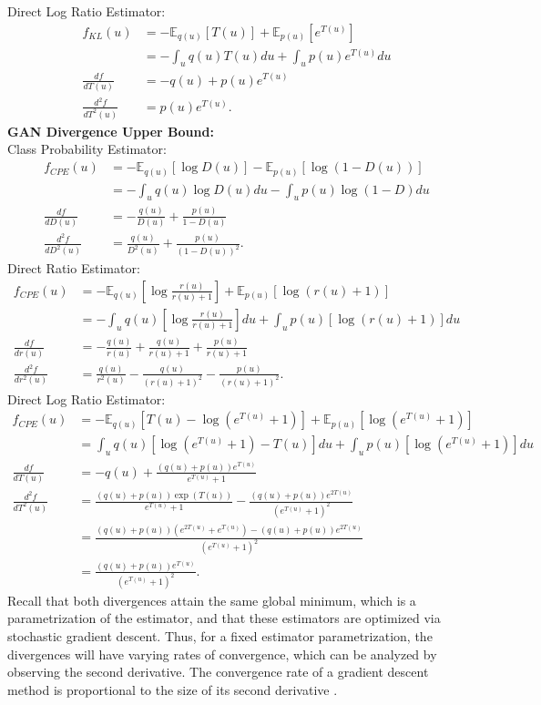 \documentclass[honours,12pt]{unswthesis}
\newcommand{\E}{\mathbb{E}}
\numberwithin{equation}{section}
\theoremstyle{definition}
\begin{document}
Direct Log Ratio Estimator:
\begin{align*}
f_{KL}(u)&=-\E_{q(u)}[T(u)]+\E_{p(u)}[e^{T(u)}]\\
&=-\int_u q(u)T(u)du+\int_u p(u)e^{T(u)}du\\
\frac{df}{dT(u)}&=-q(u)+p(u)e^{T(u)}\\
\frac{d^2f}{dT^2(u)}&=p(u)e^{T(u)}.
\end{align*}
\textbf{GAN Divergence Upper Bound:}\\
Class Probability Estimator:
\begin{align*}
f_{CPE}(u)&=-\E_{q(u)}[\log D(u)]-\E_{p(u)}[\log (1-D(u))]\\
&=-\int_u q(u)\log D(u) du -\int_u p(u)\log(1-D)du\\
\frac{df}{dD(u)}&=-\frac{q(u)}{D(u)}+\frac{p(u)}{1-D(u)}\\
\frac{d^2f}{dD^2(u)}&=\frac{q(u)}{D^2(u)}+\frac{p(u)}{(1-D(u))^2}.
\end{align*}
Direct Ratio Estimator:
\begin{align*}
f_{CPE}(u)&=-\E_{q(u)}\left[\log \frac{r(u)}{r(u)+1}\right]+\E_{p(u)}\left[\log(r(u)+1)\right]\\
&=-\int_u q(u)\left[\log \frac{r(u)}{r(u)+1}\right]du+\int_u p(u)\left[\log(r(u)+1)\right]du\\
\frac{df}{dr(u)}&=-\frac{q(u)}{r(u)}+\frac{q(u)}{r(u)+1}+\frac{p(u)}{r(u)+1}\\
\frac{d^2f}{dr^2(u)}&=\frac{q(u)}{r^2(u)}-\frac{q(u)}{(r(u)+1)^2}-\frac{p(u)}{(r(u)+1)^2}.
\end{align*}
Direct Log Ratio Estimator:
\begin{align*}
f_{CPE}(u)&=-\E_{q(u)}[T(u)-\log(e^{T(u)}+1)]+\E_{p(u)}[\log(e^{T(u)}+1)]\\
&=\int_u q(u)[\log(e^{T(u)}+1)-T(u)] du+\int_u p(u)[\log(e^{T(u)}+1)]du\\
\frac{df}{dT(u)}&=-q(u)+\frac{(q(u)+p(u))e^{T(u)}}{e^{T(u)}+1}\\
\frac{d^2f}{dT^2(u)}&=\frac{(q(u)+p(u))\exp(T(u))}{e^{T(u)}+1}-\frac{(q(u)+p(u))e^{2T(u)}}{(e^{T(u)}+1)^2}\\
&=\frac{(q(u)+p(u))(e^{2T(u)}+e^{T(u)})-(q(u)+p(u))e^{2T(u)}}{(e^{T(u)}+1)^2}\\
&=\frac{(q(u)+p(u))e^{T(u)}}{(e^{T(u)}+1)^2}.
\end{align*}
Recall that both divergences attain the same global minimum, which is a parametrization of the estimator, and that these estimators are optimized via stochastic gradient descent. Thus, for a fixed estimator parametrization, the divergences will have varying rates of convergence, which can be analyzed by observing the second derivative. The convergence rate of a gradient descent method is proportional to the size of its second derivative \citep{lecun}.
\end{document}
